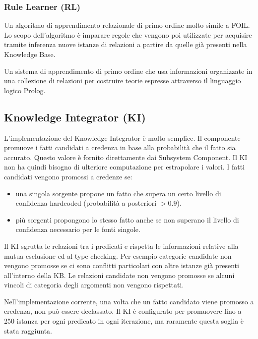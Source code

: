 \subsubsection{Rule Learner (RL)}
Un algoritmo di apprendimento relazionale di primo ordine molto simile a FOIL. Lo scopo dell'algoritmo è imparare regole che vengono poi utilizzate per acquisire tramite inferenza nuove istanze di relazioni a partire da quelle già presenti nella Knowledge Base.
\begin{info}[FOIL]
	Un sistema di apprendimento di primo ordine che usa informazioni organizzate in una collezione di relazioni per costruire teorie espresse attraverso il linguaggio logico Prolog\cite{Inductio61:online}.
\end{info}

\subsection{Knowledge Integrator (KI)}
L'implementazione del Knowledge Integrator è molto semplice. Il componente promuove i fatti candidati a credenza in base alla probabilità che il fatto sia accurato. Questo valore è fornito direttamente dai Subsystem Component. Il KI non ha quindi bisogno di ulteriore computazione per estrapolare i valori.
I fatti candidati vengono promossi a credenze se:
\begin{itemize}
	\item una singola sorgente propone un fatto che supera un certo livello di confidenza hardcoded (probabilità a posteriori $> 0.9$).
	\item più sorgenti propongono lo stesso fatto anche se non superano il livello di confidenza necessario per le fonti singole.
\end{itemize}
Il KI sgrutta le relazioni tra i predicati e rispetta le informazioni relative alla mutua esclusione ed al type checking. Per esempio categorie candidate non vengono promosse se ci sono conflitti particolari con altre istanze già presenti all'interno della KB.
Le relazioni candidate non vengono promosse se alcuni vincoli di categoria degli argomenti non vengono rispettati.

\noindent Nell'implementazione corrente, una volta che un fatto candidato viene promosso a credenza, non può essere declassato. Il KI è configurato per promuovere fino a 250 istanza per ogni predicato in ogni iterazione, ma raramente questa soglia è stata raggiunta.
\newpage